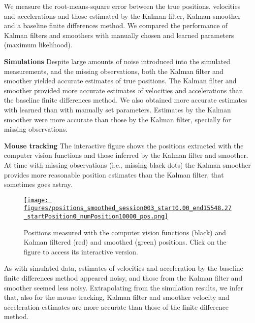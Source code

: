 
We measure the root-means-square error between the true positions, velocities
and accelerations and those estimated by the Kalman filter, Kalman smoother and
a baseline finite differences method. We compared the performance of Kalman
filters and smoothers with manually chosen and learned parameters (maximum
likelihood).

\noindent\textbf{Simulations}
%
Despite large amounts of noise introduced into the simulated measurements, and
the missing observations, both the Kalman filter and smoother yielded accurate
estimates of true positions.
%
The Kalman filter and smoother provided more accurate estimates of velocities
and accelerations than the baseline finite differences method.
%
We also obtained more accurate estimates with learned than with manually set
parameters.
%
Estimates by the Kalman smoother were more accurate than those by the Kalman
filter, specially for missing observations.

\noindent\textbf{Mouse tracking}
%
The interactive figure shows the positions extracted with the computer vision
functions and those inferred by the Kalman filter and smoother. At time with
missing observations (i.e., missing black dots) the Kalman smoother provides
more reasonable position estimates than the Kalman filter, that sometimes goes
astray.

\begin{figure}
    \begin{center}
        \href{http://www.gatsby.ucl.ac.uk/~rapela/fwg/reports/learning/figures/positions_smoothed_session003_start0.00_end15548.27_startPosition0_numPosition10000_pos.html}{\texttt{[image: figures/positions\_smoothed\_session003\_start0.00\_end15548.27\_startPosition0\_numPosition10000\_pos.png]}}
        \caption{Positions measured with the computer vision functions (black) and Kalman filtered (red) and smoothed (green) positions. Click on the figure to access its interactive version.}
    \end{center}
\end{figure}

As with simulated data, estimates of velocities and acceleration by the
baseline finite differences method appeared noisy, and those from the Kalman
filter and smoother seemed less noisy. Extrapolating from the simulation results,
we infer that, also for the mouse tracking, Kalman filter and smoother velocity
and acceleration estimates are more accurate than those of the finite
difference method.
